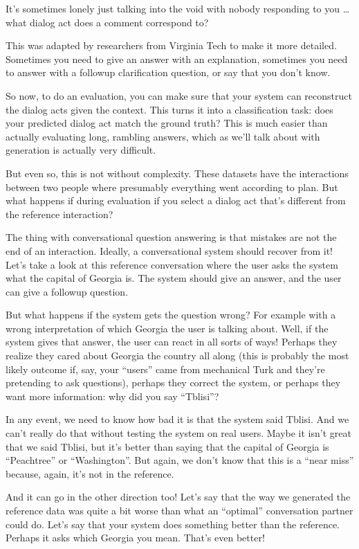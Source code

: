 It’s sometimes lonely just talking into the void with nobody responding to you … what dialog act does a comment correspond to?

This was adapted by researchers from Virginia Tech to make it more detailed.  Sometimes you need to give an answer with an explanation, sometimes you need to answer with a followup clarification question, or say that you don’t know.

So now, to do an evaluation, you can make sure that your system can reconstruct the dialog acts given the context.  This turns it into a classification task: does your predicted dialog act match the ground truth?  This is much easier than actually evaluating long, rambling answers, which as we’ll talk about with generation is actually very difficult.

But even so, this is not without complexity.  These datasets have the interactions between two people where presumably everything went according to plan.  But what happens if during evaluation if you select a dialog act that’s different from the reference interaction?

The thing with conversational question answering is that mistakes are not the end of an interaction.  Ideally, a conversational system should recover from it!  Let’s take a look at this reference conversation where the user asks the system what the capital of Georgia is. The system should give an answer, and the user can give a followup question.

But what happens if the system gets the question wrong?  For example with a wrong interpretation of which Georgia the user is talking about.  Well, if the system gives that answer, the user can react in all sorts of ways!  Perhaps they realize they cared about Georgia the country all along (this is probably the most likely outcome if, say, your “users” came from mechanical Turk and they’re pretending to ask questions), perhaps they correct the system, or perhaps they want more information: why did you say “Tblisi”?

In any event, we need to know how bad it is that the system said Tblisi.  And we can’t really do that without testing the system on real users.  Maybe it isn’t great that we said Tblisi, but it’s better than saying that the capital of Georgia is “Peachtree” or “Washington”.  But again, we don’t know that this is a “near miss” because, again, it’s not in the reference.

And it can go in the other direction too!  Let’s say that the way we generated the reference data was quite a bit worse than what an “optimal” conversation partner could do.  Let’s say that your system does something better than the reference.  Perhaps it asks which Georgia you mean.  That’s even better!

